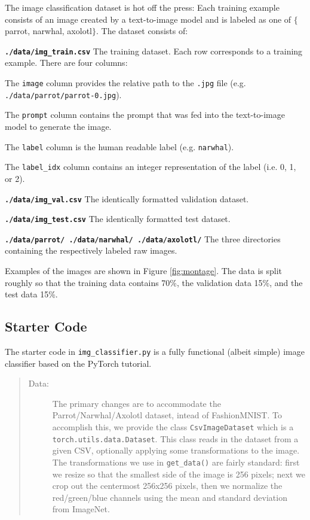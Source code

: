 \documentclass[11pt,addpoints,answers]{exam}
\begin{document}
\begin{questions}
The image classification dataset is hot off the press: Each training example consists of an image created by a text-to-image model and is labeled as one of $\{$parrot, narwhal, axolotl$\}$. The dataset consists of:
\begin{description}
    \item \textbf{ \lstinline{./data/img_train.csv} } The training dataset. Each row corresponds to a training example. There are four columns: 
    \begin{enumerate*}
        \item The \lstinline{image} column provides the relative path to the \lstinline{.jpg} file (e.g. \lstinline{./data/parrot/parrot-0.jpg}). 
        \item The \lstinline{prompt} column contains the prompt that was fed into the text-to-image model to generate the image. 
        \item The \lstinline{label} column is the human readable label (e.g. \lstinline{narwhal}). 
        \item The \lstinline{label_idx} column contains an integer representation of the label (i.e. 0, 1, or 2).
    \end{enumerate*}
    \item \textbf{ \lstinline{./data/img_val.csv} } The identically formatted validation dataset. 
    \item \textbf{ \lstinline{./data/img_test.csv} } The identically formatted test dataset.
    \item \textbf{ \lstinline{./data/parrot/ ./data/narwhal/ ./data/axolotl/} } The three directories containing the respectively labeled raw images.
\end{description}
Examples of the images are shown in Figure \ref{fig:montage}. The data is split roughly so that the training data contains 70\%, the validation data 15\%, and the test data 15\%. 

\subsection*{Starter Code}

The starter code in \lstinline{img_classifier.py} is a fully functional (albeit simple) image classifier based on the PyTorch tutorial. 

\begin{quote}
\begin{description}

\item[Data:] The primary changes are to accommodate the Parrot/Narwhal/Axolotl dataset, intead of FashionMNIST. To accomplish this, we provide the class \lstinline{CsvImageDataset} which is a  \lstinline{torch.utils.data.Dataset}. This class reads in the dataset from a given CSV, optionally applying some transformations to the image. The transformations we use in \lstinline{get_data()} are fairly standard: first we resize so that the smallest side of the image is 256 pixels; next we crop out the centermost 256x256 pixels, then we normalize the red/green/blue channels using the mean and standard deviation from ImageNet. 


\end{description}
\end{quote}
\end{questions}
\end{document}
